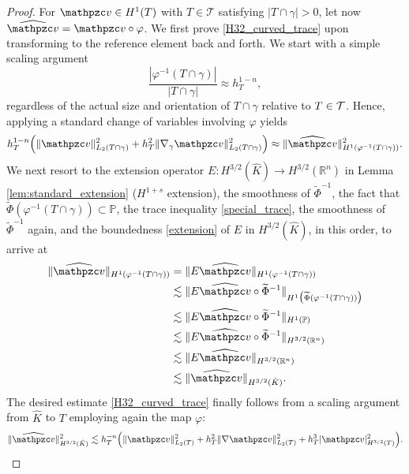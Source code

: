 \begin{proof}
For $\tv \in H^1(T)$ with $T \in \mathcal T$ satisfying $|T\cap \gamma|>0$, let now $\widehat{\tv}=\tv \circ \varphi$. We first prove \eqref{H32_curved_trace} upon transforming to the reference element back and forth. We start with a simple scaling argument
%
\[
\frac{|\varphi^{-1}(T\cap\gamma)|}{|T\cap\gamma|} \approx h_T^{1-n},
\]
%
regardless of the actual size and orientation of $T\cap\gamma$ relative to $T\in\mathcal{T}$. Hence, applying a standard change of variables involving $\varphi$ yields
%
\[
h_T^{1-n} \Big( \|\tv\|_{L_2(T \cap \gamma)}^2  + h_T^2\|\nabla_\gamma \tv \|_{L_2(T \cap \gamma)}^2 \Big) \approx \|\widehat{\tv}\|_{H^1(\varphi^{-1}(T \cap \gamma))}^2.
\]
%
We next resort to the extension operator $E:H^{3/2}(\hat K)\to H^{3/2}(\mathbb{R}^n)$ in Lemma \ref{lem:standard_extension} ($H^{1+s}$ extension), the smoothness of $\widetilde\Phi^{-1}$, the fact that $\widetilde\Phi( \varphi^{-1}(T \cap \gamma))\subset\mathbb{P}$, the trace inequality \eqref{special_trace}, the smoothness of $\widetilde\Phi^{-1}$ again, and the boundedness \eqref{extension} of $E$ in $H^{3/2}(\hat K)$, in this order, to arrive at
%
\begin{align*}
\|\widehat{\tv}\|_{H^1(\varphi^{-1}(T \cap \gamma))} &=
\|E \widehat{\tv}\|_{H^1(\varphi^{-1} (T \cap \gamma))}
\\ & \lesssim \|E \widehat{\tv} \circ \widetilde\Phi^{-1}\|_{H^1\big(\widetilde\Phi( \varphi^{-1}(T \cap \gamma))\big)}
\\ & \lesssim \|E \widehat{\tv} \circ \widetilde\Phi^{-1}\|_{H^1(\mathbb{P})}
\\ & \lesssim \|E \widehat{\tv} \circ \widetilde\Phi^{-1}\|_{H^{3/2}(\mathbb{R}^n)}
\\ & \lesssim \|E \widehat{\tv}\|_{H^{3/2}(\mathbb{R}^n)}
\\ & \lesssim \|\widehat{\tv}\|_{H^{3/2}(\hat{K})}.
\end{align*}
%
The desired estimate \eqref{H32_curved_trace} finally follows from a scaling argument
from $\hat K$ to $T$ employing again the map $\varphi$:
%
\[
\|\widehat{\tv}\|_{H^{3/2}(\hat{K})}^2
\lesssim h_T^{-n} \Big(\|\tv\|_{L_2(T)}^2 + h_T^2 \|\nabla \tv\|_{L_2(T)}^2 + h_T^3 |\tv|_{H^{3/2}(T)}^2 \Big).
\]
%


\end{proof}
